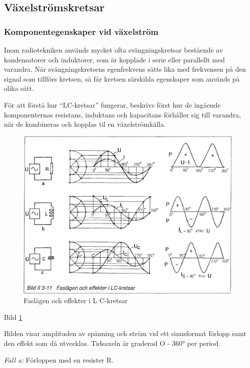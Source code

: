 \subsection{Växelströmskretsar}

\subsubsection{Komponentegenskaper vid växelström}

Inom radiotekniken används mycket ofta svängningskretsar bestående av
kondensatorer och induktorer, som är kopplade i serie eller parallellt med
varandra. När svängningskretsens egenfrekvens sätts lika med frekvensen på den
signal som tillförs kretsen, så får kretsen särskilda egenskaper som används på
olika sätt.

För att förstå hur ``LC-kretsar'' fungerar, beskrivs först hur de ingående
komponenternas resistans, induktans och kapacitans förhåller sig till varandra,
när de kombineras och kopplas til en växelströmkälla.

\begin{figure}
\includegraphics[width=\textwidth]{images/bild_2_3-11}
\caption{Faslägen och effekter i L C-kretsar}
\label{fig:BildII3-11}
\end{figure}

Bild \ref{fig:BildII3-11}

Bilden visar amplituden av spänning och ström vid ett sinusformat förlopp samt
den effekt som då utvecklas. Tidsaxeln är graderad O - 360° per period.

\emph{Fall a:} Förloppen med en resister R.


